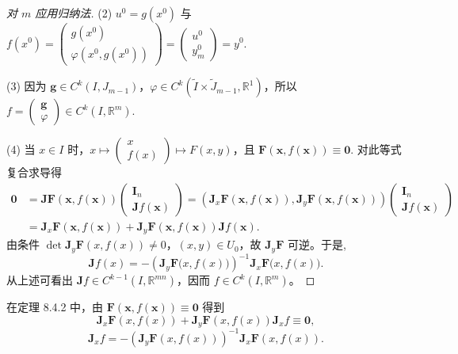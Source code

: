 \begin{proof}[对 $m$ 应用归纳法]
(2) $u^{0} = g(x^{0})$ 与 $f(x^{0}) = \begin{pmatrix} g(x^{0}) \\ \varphi(x^{0},g(x^{0})) \end{pmatrix} = \begin{pmatrix} u^{0} \\ y_{m}^{0} \end{pmatrix} = y^{0}$.

(3) 因为 $\boldsymbol{g} \in C^{k}(I,J_{m-1})$，$\varphi \in C^{k}(\widetilde{I} \times \widetilde{J}_{m-1},\mathbb{R}^{1})$，所以 $f = \begin{pmatrix} \boldsymbol{g} \\ \varphi \end{pmatrix} \in C^{k}(I,\mathbb{R}^{m})$.

(4) 当 $x \in I$ 时，$x \mapsto \begin{pmatrix} x \\ f(x) \end{pmatrix} \mapsto F(x,y)$，且 $\boldsymbol{F}(\boldsymbol{x},f(\boldsymbol{x})) \equiv \boldsymbol{0}$. 对此等式复合求导得
\begin{align*}
  \boldsymbol{0} &= \boldsymbol{J}\boldsymbol{F}(\boldsymbol{x},f(\boldsymbol{x}))\begin{pmatrix} \boldsymbol{I}_{n} \\ \boldsymbol{J}f(\boldsymbol{x}) \end{pmatrix} = \left(\boldsymbol{J}_{x}\boldsymbol{F}(\boldsymbol{x},f(\boldsymbol{x})),\boldsymbol{J}_{y}\boldsymbol{F}(\boldsymbol{x},f(\boldsymbol{x}))\right)\begin{pmatrix} \boldsymbol{I}_{n} \\ \boldsymbol{J}f(\boldsymbol{x}) \end{pmatrix} \\
  &= \boldsymbol{J}_{x}\boldsymbol{F}(\boldsymbol{x},f(\boldsymbol{x})) + \boldsymbol{J}_{y}\boldsymbol{F}(\boldsymbol{x},f(\boldsymbol{x}))\boldsymbol{J}f(\boldsymbol{x}).
\end{align*}
由条件 $\det \boldsymbol{J}_{y}\boldsymbol{F}(x,f(x)) \neq 0$，$(x,y) \in U_{0}$，故 $\boldsymbol{J}_{y}\boldsymbol{F}$ 可逆。于是,
\[
  \boldsymbol{J}f(x) = -\left(\boldsymbol{J}_{y}\boldsymbol{F}\bigl(x,f(x)\bigr)\right)^{-1}\boldsymbol{J}_{x}\boldsymbol{F}\bigl(x,f(x)\bigr).
\]
从上述可看出 $\boldsymbol{J}f \in C^{k-1}(I,\mathbb{R}^{mn})$，因而 $f \in C^{k}(I,\mathbb{R}^{m})$。
\end{proof}

\begin{remark}\label{rem:8.4.1}
在定理 8.4.2 中，由 $\boldsymbol{F}(\boldsymbol{x},f(\boldsymbol{x})) \equiv \boldsymbol{0}$ 得到
\[
  \boldsymbol{J}_{x}\boldsymbol{F}(x,f(x)) + \boldsymbol{J}_{y}\boldsymbol{F}(x,f(x))\boldsymbol{J}_{x}f \equiv \boldsymbol{0},
\]
\[
  \boldsymbol{J}_{x}f = -\left(\boldsymbol{J}_{y}\boldsymbol{F}(x,f(x))\right)^{-1}\boldsymbol{J}_{x}\boldsymbol{F}(x,f(x)).
\]
\end{remark}

